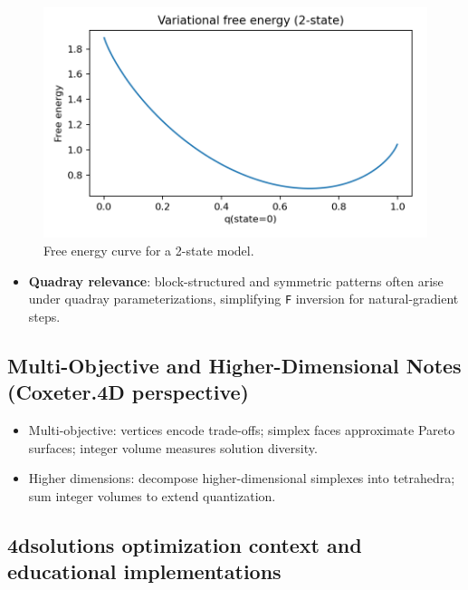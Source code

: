 \documentclass[
]{article}
\providecommand{\tightlist}{%
  \setlength{\itemsep}{0pt}\setlength{\parskip}{0pt}}
\begin{document}
\begin{figure}
\hypertarget{fig:free_energy_curve}{%
\centering
\includegraphics{../output/figures/free_energy_curve.png}
\caption{Free energy curve for a 2-state
model.}\label{fig:free_energy_curve}
}
\end{figure}

\begin{itemize}
\tightlist
\item
  \textbf{Quadray relevance}: block-structured and symmetric patterns
  often arise under quadray parameterizations, simplifying \texttt{F}
  inversion for natural-gradient steps.
\end{itemize}

\hypertarget{multi-objective-and-higher-dimensional-notes-coxeter.4d-perspective}{%
\subsection{Multi-Objective and Higher-Dimensional Notes (Coxeter.4D
perspective)}\label{multi-objective-and-higher-dimensional-notes-coxeter.4d-perspective}}

\begin{itemize}
\tightlist
\item
  Multi-objective: vertices encode trade-offs; simplex faces approximate
  Pareto surfaces; integer volume measures solution diversity.
\item
  Higher dimensions: decompose higher-dimensional simplexes into
  tetrahedra; sum integer volumes to extend quantization.
\end{itemize}

\hypertarget{dsolutions-optimization-context-and-educational-implementations}{%
\subsection{4dsolutions optimization context and educational
implementations}\label{dsolutions-optimization-context-and-educational-implementations}}
\end{document}
